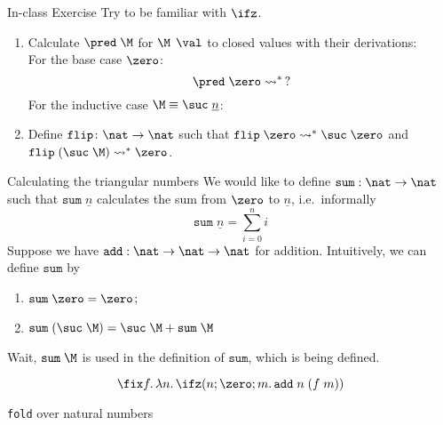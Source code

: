 \begin{frame}{In-class Exercise}
  Try to be familiar with $\ifz$.
  \begin{enumerate}
    \item Calculate $\pred\;\M$ for $\M \;\,\val$
      to closed values with their derivations: \\
      For the base case
      $\zero$:
      \[
        \pred\;\zero \leadsto^*\, ?
      \]
      For the inductive case $\M \equiv \suc\; \underline{n}$:
      \begin{prooftree}
      \end{prooftree}
    \item Define $\mathtt{flip}\colon \nat \to \nat$
      such that $\mathtt{flip}\;\zero \leadsto^* \suc\; \zero$
      and $\mathtt{flip}\; (\suc \;\M) \leadsto^* \zero$. 
  \end{enumerate}
\end{frame}

\begin{frame}{Calculating the triangular numbers}
  We would like to define $\mathtt{sum}:\nat \to\nat$ such that 
  $\mathtt{sum}\;\underline{n}$ calculates the sum from $\zero$
  to $\underline{n}$, i.e.\ informally 
  \[
    \mathtt{sum}\; \underline{n} = \sum_{i = 0}^n i 
  \]
  Suppose we have $\texttt{add} : \nat \to \nat \to \nat$ for addition. 
  Intuitively, we can define $\mathtt{sum}$ by
  \begin{enumerate}
    \item $\mathtt{sum}\;\zero = \zero$; 
    \item $\mathtt{sum}\;(\suc\;\M) =
      \suc\; \M\mathbin{\mathtt{+}}\mathtt{sum}\;\M$
  \end{enumerate}
  Wait, $\texttt{sum}\;\M$
 is used in the definition of $\texttt{sum}$, which is being defined. 
\end{frame}

\begin{frame}
  \begin{equation}
    \label{eq:triangular_num}
    \fix f.\, \lambda n .\, \ifz(n; \zero; m .\, \mathtt{add}\; n\; (f\; m))
  \end{equation}
\end{frame}

\begin{frame}{\texttt{fold} over natural numbers}
\end{frame}

